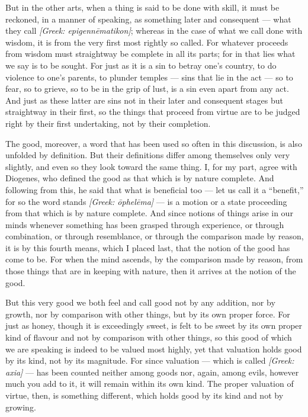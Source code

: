  But in the other arts, when a thing is said to be done with skill, it must be reckoned, in a manner of speaking, as something later and consequent — what they call \textit{[Greek: epigennēmatikon]}; whereas in the case of what we call done with wisdom, it is from the very first most rightly so called. For whatever proceeds from wisdom must straightway be complete in all its parts; for in that lies what we say is to be sought. For just as it is a sin to betray one's country, to do violence to one's parents, to plunder temples — sins that lie in the act — so to fear, so to grieve, so to be in the grip of lust, is a sin even apart from any act. And just as these latter are sins not in their later and consequent stages but straightway in their first, so the things that proceed from virtue are to be judged right by their first undertaking, not by their completion.

 The good, moreover, a word that has been used so often in this discussion, is also unfolded by definition. But their definitions differ among themselves only very slightly, and even so they look toward the same thing. I, for my part, agree with Diogenes, who defined the good as that which is by nature complete. And following from this, he said that what is beneficial too — let us call it a ``benefit,'' for so the word stands \textit{[Greek: ōphelēma]} — is a motion or a state proceeding from that which is by nature complete. And since notions of things arise in our minds whenever something has been grasped through experience, or through combination, or through resemblance, or through the comparison made by reason, it is by this fourth means, which I placed last, that the notion of the good has come to be. For when the mind ascends, by the comparison made by reason, from those things that are in keeping with nature, then it arrives at the notion of the good.

 But this very good we both feel and call good not by any addition, nor by growth, nor by comparison with other things, but by its own proper force. For just as honey, though it is exceedingly sweet, is felt to be sweet by its own proper kind of flavour and not by comparison with other things, so this good of which we are speaking is indeed to be valued most highly, yet that valuation holds good by its kind, not by its magnitude. For since valuation — which is called \textit{[Greek: axia]} — has been counted neither among goods nor, again, among evils, however much you add to it, it will remain within its own kind. The proper valuation of virtue, then, is something different, which holds good by its kind and not by growing.

